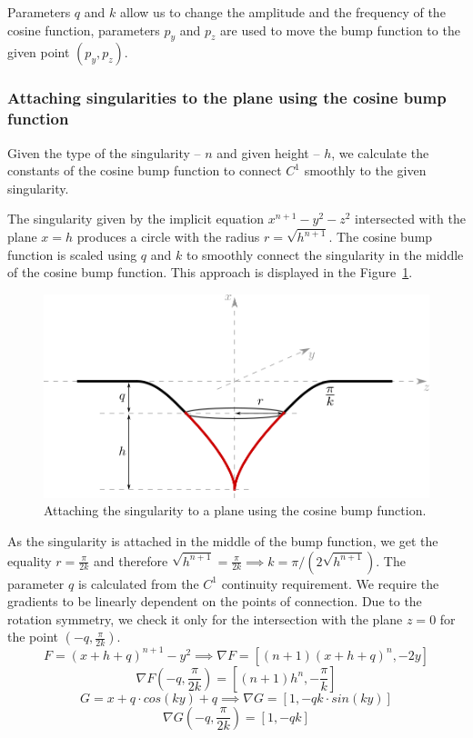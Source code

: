 Parameters $q$ and $k$ allow us to change the amplitude and the frequency of
the cosine function, parameters $p_y$ and $p_z$ are used to move the bump function
to the given point $(p_y, p_z)$.

\subsubsection*{Attaching singularities to the plane using the cosine bump function}

Given the type of the singularity -- $n$ and given height -- $h$, we calculate the
constants of the cosine bump function to connect $C^1$ smoothly to the given
singularity.

The singularity given by the implicit equation $x^{n+1}-y^2-z^2$ intersected with 
the plane $x=h$ produces a circle with the radius $r=\sqrt{h^{n+1}}$.
The cosine bump function is scaled using $q$ and $k$ to smoothly connect the
singularity in the middle of the cosine bump function. This approach is displayed
in the Figure~\ref{img:25}. 

\begin{figure}
    \centerline{\includegraphics[scale=0.5]{images/img25}}
    \caption[Attaching the singularity to a plane using the cosine bump function]
    {Attaching the singularity to a plane using the cosine bump function.}
    \label{img:25}
\end{figure}

As the singularity is attached in the middle of the
bump function, we get the equality $r=\frac{\pi}{2k}$ and therefore
$\sqrt{h^{n+1}}=\frac{\pi}{2k} \implies k=\pi/(2\sqrt{h^{n+1}})$.
The parameter $q$ is calculated from the $C^1$ continuity requirement. We require the
gradients to be linearly dependent on the points of connection. Due to the rotation
symmetry, we check it only for the intersection with the plane $z=0$
for the point $(-q, \frac{\pi}{2k})$.
$$F=(x+h+q)^{n+1}-y^2 \implies \nabla F = \left[(n+1)(x+h+q)^n, -2y\right]$$
$$\nabla F \left(-q, \frac{\pi}{2k}\right) = \left[(n+1) h^n, -\frac{\pi}{k}\right]$$
$$G=x+q \cdot cos(k y)+q \implies \nabla G = \left[1, -qk \cdot sin(k y)\right]$$
$$\nabla G \left(-q, \frac{\pi}{2k}\right) = \left[1, -qk \right]$$

